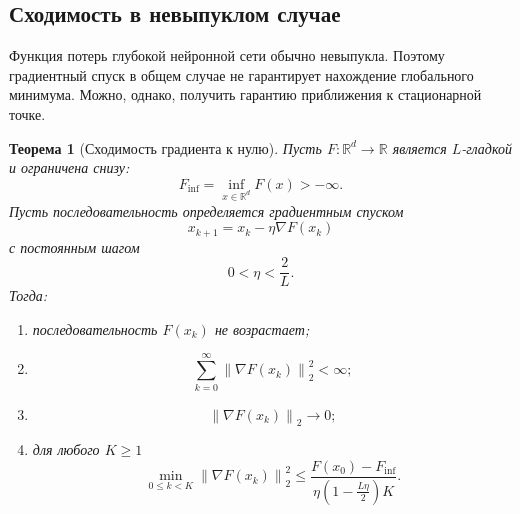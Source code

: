 \documentclass[12pt,a4paper]{article}
\theoremstyle{plain}
\newtheorem{theorem}{Теорема}[section]
\theoremstyle{definition}
\theoremstyle{remark}
\newcommand{\R}{\mathbb{R}}
\newcommand{\norm}[1]{\left\lVert #1 \right\rVert}
\begin{document}
\subsection{Сходимость в невыпуклом случае}

Функция потерь глубокой нейронной сети обычно невыпукла. Поэтому
градиентный спуск в общем случае не гарантирует нахождение
глобального минимума. Можно, однако, получить гарантию приближения
к стационарной точке.

\begin{theorem}[Сходимость градиента к нулю]
Пусть $F\colon\R^d\to\R$ является $L$-гладкой и ограничена снизу:
\[
    F_{\inf}
    =
    \inf_{x\in\R^d}F(x)>-\infty.
\]
Пусть последовательность определяется градиентным спуском
\[
    x_{k+1}=x_k-\eta\nabla F(x_k)
\]
с постоянным шагом
\[
    0<\eta<\frac{2}{L}.
\]
Тогда:

\begin{enumerate}
    \item последовательность $F(x_k)$ не возрастает;
    \item
    \[
        \sum_{k=0}^{\infty}
        \norm{\nabla F(x_k)}_2^2<\infty;
    \]
    \item
    \[
        \norm{\nabla F(x_k)}_2\longrightarrow 0;
    \]
    \item для любого $K\geq 1$
    \[
        \min_{0\leq k<K}
        \norm{\nabla F(x_k)}_2^2
        \leq
        \frac{
            F(x_0)-F_{\inf}
        }{
            \eta
            \left(
                1-\frac{L\eta}{2}
            \right)K
        }.
    \]
\end{enumerate}
\end{theorem}
\end{document}
